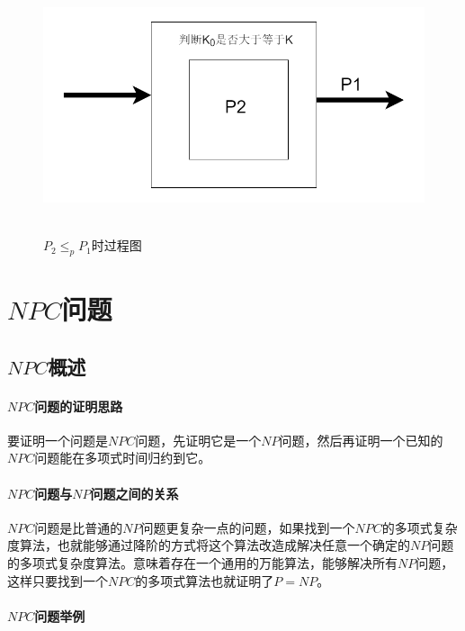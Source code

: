 		\begin{figure}[h]
		\begin{minipage}[t]{1\linewidth}
			\centering
			\includegraphics[width=15cm,height=7.5cm]{image/P_NP3.png}
			\caption{$P_2\leq_pP_1$时过程图}\label{fig:P2-leq-P1}
		\end{minipage}
	\end{figure}
	
\newpage
	\section{$NPC$问题}
	\subsection{$NPC$概述}

\paragraph*{$NPC$问题的证明思路}

	
要证明一个问题是$NPC$问题，先证明它是一个$NP$问题，然后再证明一个已知的$NPC$问题能在多项式时间归约到它。

\paragraph*{$NPC$问题与$NP$问题之间的关系}


$NPC$问题是比普通的$NP$问题更复杂一点的问题，如果找到一个$NPC$的多项式复杂度算法，也就能够通过降阶的方式将这个算法改造成解决任意一个确定的$NP$问题的多项式复杂度算法。意味着存在一个通用的万能算法，能够解决所有$NP$问题，这样只要找到一个$NPC$的多项式算法也就证明了$P=NP$。
	
\paragraph*{$NPC$问题举例}
	\subparagraph*{}
	
